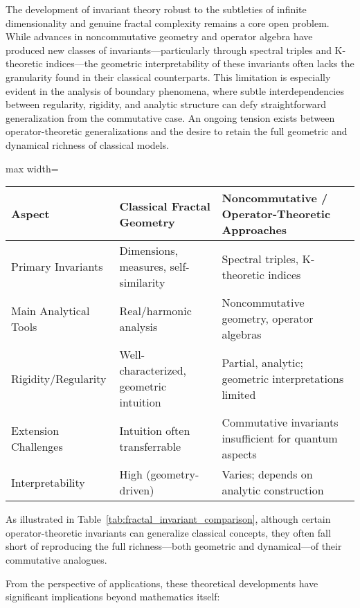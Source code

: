 \documentclass[sigconf]{acmart}
\begin{document}
The development of invariant theory robust to the subtleties of infinite dimensionality and genuine fractal complexity remains a core open problem. While advances in noncommutative geometry and operator algebra have produced new classes of invariants—particularly through spectral triples and K-theoretic indices—the geometric interpretability of these invariants often lacks the granularity found in their classical counterparts. This limitation is especially evident in the analysis of boundary phenomena, where subtle interdependencies between regularity, rigidity, and analytic structure can defy straightforward generalization from the commutative case. An ongoing tension exists between operator-theoretic generalizations and the desire to retain the full geometric and dynamical richness of classical models.

\begin{table*}[htbp]
\centering
\caption{Comparison of Classical and Noncommutative Fractal Invariants}
\label{tab:fractal_invariant_comparison}
\begin{adjustbox}{max width=\textwidth}
\begin{tabular}{lll}
\toprule
\textbf{Aspect} & \textbf{Classical Fractal Geometry} & \textbf{Noncommutative / Operator-Theoretic Approaches} \\
\midrule
Primary Invariants & Dimensions, measures, self-similarity & Spectral triples, K-theoretic indices \\
Main Analytical Tools & Real/harmonic analysis & Noncommutative geometry, operator algebras \\
Rigidity/Regularity & Well-characterized, geometric intuition & Partial, analytic; geometric interpretations limited \\
Extension Challenges & Intuition often transferrable & Commutative invariants insufficient for quantum aspects \\
Interpretability & High (geometry-driven) & Varies; depends on analytic construction \\
\bottomrule
\end{tabular}
\end{adjustbox}
\end{table*}

As illustrated in Table~\ref{tab:fractal_invariant_comparison}, although certain operator-theoretic invariants can generalize classical concepts, they often fall short of reproducing the full richness—both geometric and dynamical—of their commutative analogues.

From the perspective of applications, these theoretical developments have significant implications beyond mathematics itself:
\end{document}
